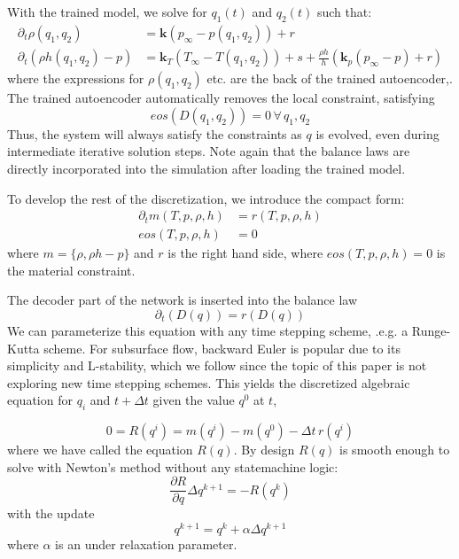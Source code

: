 \documentclass[AMA,STIX1COL]{WileyNJD-v2}
\begin{document}
With the trained model, we solve for \(q_1(t)\) and \(q_2(t)\) such that:
\begin{align}
\partial_t \rho(q_1,q_2) & = \mathbf{k} \left( p_\infty-p(q_1,q_2) \right)  + r \\
\partial_t \left(\rho h(q_1,q_2)-p\right) &
                                            =\mathbf{k}_T(T_\infty-T(q_1,q_2))  + s + \frac{\rho h}{h}\left(\mathbf{k}_p(p_\infty - p) + r\right)
\end{align}
where the expressions for  \(\rho(q_1,q_2)\) etc. are the back of the
trained autoencoder,. The trained
autoencoder automatically removes the local constraint, satisfying
\begin{equation}
eos(D(q_1,q_2)) = 0 \, \forall \,q_1,q_2
\end{equation}
Thus, the system will always satisfy the constraints as $q$ is
evolved, even during intermediate iterative solution steps. Note again
that the balance laws are directly incorporated into the simulation
after loading the trained model.

To develop the rest of the discretization, we introduce the compact form:
\begin{align}
\partial_t m(T,p,\rho,h) &= r(T,p,\rho,h)\\
eos(T,p,\rho,h) &= 0
\end{align}
where $m=\{\rho,\rho h -p\}$ and $r$ is the right hand side, where
$eos(T,p,\rho,h)=0$ is the material constraint.


The decoder part of the network is inserted into the balance law
\begin{equation}
\partial_t (D(q)) = r(D(q))
\end{equation}
We can parameterize this equation with any time stepping scheme, .e.g. a
Runge-Kutta scheme. For subsurface flow, backward Euler is popular due
to its simplicity and L-stability, which we follow since the topic of
this paper is not exploring new time stepping schemes. This yields the
discretized algebraic equation for \(q_i\) and \(t+\Delta t\) given the
value \(q^0\) at \(t\),

\begin{equation}
0 = R(q^i) = m(q^{i}) - m(q^{0}) - \Delta t \, r(q^i)
\end{equation}
where we have called the equation \(R(q)\). By design \(R(q)\) is smooth
enough to solve with Newton's method without any statemachine logic:
\begin{equation}
\frac{\partial R}{\partial q} \Delta q^{k+1} = - R(q^k)
\end{equation}
with the update
\begin{equation}
q^{k+1} = q^k + \alpha\Delta q^{k+1}
\end{equation}
where $\alpha$ is an under relaxation parameter.
\end{document}
